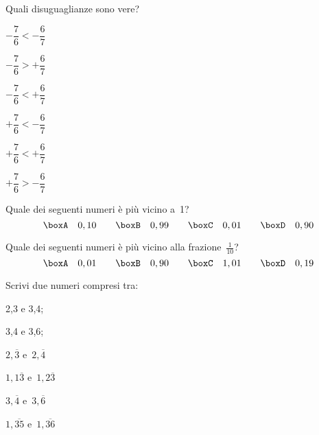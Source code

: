 
\begin{esercizio}
\label{ese:3.39}
Quali disuguaglianze sono vere?
\begin{multicols}{2}
\TabPositions{2.5cm}
\begin{enumeratea}
\spazielenx
 \item \(-\dfrac{7}{6}<-\dfrac{6}{7}\)\tab\boxV\qquad\boxF
 \item \(-\dfrac{7}{6}>+\dfrac{6}{7}\)\tab\boxV\qquad\boxF
 \item \(-\dfrac{7}{6}<+\dfrac{6}{7}\)\tab\boxV\qquad\boxF
 \item \(+\dfrac{7}{6}<-\dfrac{6}{7}\)\tab\boxV\qquad\boxF
 \item \(+\dfrac{7}{6}<+\dfrac{6}{7}\)\tab\boxV\qquad\boxF
 \item \(+\dfrac{7}{6}>-\dfrac{6}{7}\)\tab\boxV\qquad\boxF
 \end{enumeratea}
\end{multicols}
\end{esercizio}

\begin{esercizio}
\label{ese:3.40}
Quale dei seguenti numeri è più vicino a~1?
\[\boxA\quad0,10\qquad\boxB\quad0,99\qquad\boxC\quad0,01\qquad\boxD\quad0,90\]
\end{esercizio}

 \begin{esercizio}
\label{ese:3.41}
Quale dei seguenti numeri è più vicino alla frazione~\(\frac{1}{10}\)?
\[\boxA\quad0,01\qquad\boxB\quad0,90\qquad\boxC\quad1,01\qquad\boxD\quad0,19\]
 \end{esercizio}

\begin{esercizio}
\label{ese:3.42}
Scrivi due numeri compresi tra:
\begin{multicols}{3}
\begin{enumeratea}
 \item 2,3 e 3,4;
 \item 3,4 e 3,6;
 \item \(2,\overline{3}\) e~\(2,\overline{4}\)
 \item \(1,1\overline{3}\) e~\(1,2\overline{3}\)
 \item \(3,\overline{4}\) e~\(3,\overline{6}\)
 \item \(1,\overline{35}\) e~\(1,\overline{36}\)
\end{enumeratea}
\end{multicols}
\end{esercizio}


